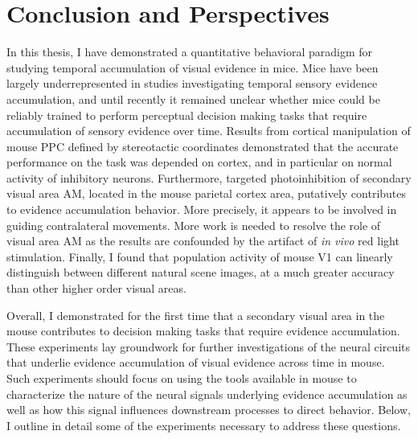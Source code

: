 
\chapter{Conclusion and Perspectives} %

\label{Chapter6} 

In this thesis, I have demonstrated a quantitative behavioral paradigm for studying temporal accumulation of visual evidence in mice. Mice have been largely underrepresented in studies investigating temporal sensory evidence accumulation, and until recently it remained unclear whether mice could be reliably trained to perform perceptual decision making tasks that require accumulation of sensory evidence over time. Results from cortical manipulation of mouse PPC defined by stereotactic coordinates demonstrated that the accurate performance on the task was depended on cortex, and in particular on normal activity of inhibitory neurons. Furthermore, targeted photoinhibition of secondary visual area AM, located in the mouse parietal cortex area, putatively contributes to evidence accumulation behavior. More precisely, it appears to be involved in guiding contralateral movements. More work is needed to resolve the role of visual area AM as the results are confounded by the artifact of \emph{in vivo} red light stimulation. Finally, I found that population activity of mouse V1 can linearly distinguish between different natural scene images, at a much greater accuracy than other higher order visual areas.\par

Overall, I demonstrated for the first time that a secondary visual area in the mouse contributes to decision making tasks that require evidence accumulation. These experiments lay groundwork for further investigations of the neural circuits that underlie evidence accumulation of visual evidence across time in mouse. Such experiments should focus on using the tools available in mouse to characterize the nature of the neural signals underlying evidence accumulation as well as how this signal influences downstream processes to direct behavior. Below, I outline in detail some of the experiments necessary to address these questions.\par 

